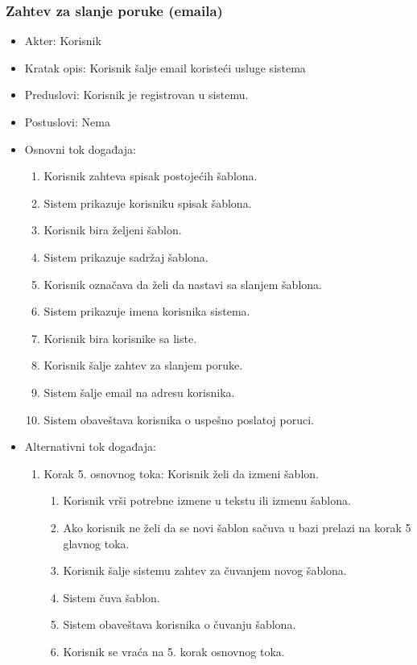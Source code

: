 \documentclass[a4paper]{article}
\begin{document}
\subsubsection{Zahtev za slanje poruke (emaila)}
\begin{itemize}
    \item Akter: Korisnik
    \item Kratak opis: Korisnik šalje email koristeći usluge sistema
    \item Preduslovi: Korisnik je registrovan u sistemu.
    \item Postuslovi: Nema
    \item Osnovni tok događaja:
        \begin{enumerate}
            \item Korisnik zahteva spisak postojećih šablona.
            \item Sistem prikazuje korisniku spisak šablona.
            \item Korisnik bira željeni šablon.
            \item Sistem prikazuje sadržaj šablona.
            \item Korisnik označava da želi da nastavi sa slanjem šablona.
            \item Sistem prikazuje imena korisnika sistema.
            \item Korisnik bira korisnike sa liste.
            \item Korisnik šalje zahtev za slanjem poruke.
            \item Sistem šalje email na adresu korisnika.
            \item Sistem obaveštava korisnika o uspešno poslatoj poruci.
        \end{enumerate}
    \item Alternativni tok događaja:
        \begin{enumerate}
            \item Korak 5. osnovnog toka: Korisnik želi da izmeni šablon.
            \begin{enumerate}
                \item Korisnik vrši potrebne izmene u tekstu ili izmenu šablona.
                \item Ako korisnik ne želi da se novi šablon sačuva u bazi prelazi na korak 5 glavnog toka.
                \item Korisnik šalje sistemu zahtev za čuvanjem novog šablona.
                \item Sistem čuva šablon.
                \item Sistem obaveštava korisnika o čuvanju šablona.
                \item Korisnik se vraća na 5. korak osnovnog toka.
            \end{enumerate}
        \end{enumerate}
\end{itemize}
\end{document}
